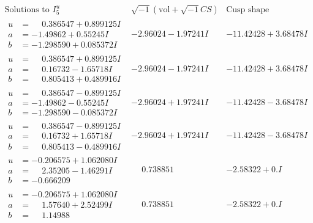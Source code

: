 \documentclass[1p]{elsarticle_modified}
\theoremstyle{definition}
\newcommand{\I}{\sqrt{-1}}
\begin{document}
$$\begin{array}{c|c|c}  
\text{Solutions to }I^u_{5}& \I (\text{vol} + \sqrt{-1}CS) & \text{Cusp shape}\\
 \hline 
\begin{aligned}
u &= \phantom{-}0.386547 + 0.899125 I \\
a &= -1.49862 + 0.55245 I \\
b &= -1.298590 + 0.085372 I\end{aligned}
 & -2.96024 - 1.97241 I & -11.42428 + 3.68478 I \\ \hline\begin{aligned}
u &= \phantom{-}0.386547 + 0.899125 I \\
a &= \phantom{-}0.16732 - 1.65718 I \\
b &= \phantom{-}0.805413 + 0.489916 I\end{aligned}
 & -2.96024 - 1.97241 I & -11.42428 + 3.68478 I \\ \hline\begin{aligned}
u &= \phantom{-}0.386547 - 0.899125 I \\
a &= -1.49862 - 0.55245 I \\
b &= -1.298590 - 0.085372 I\end{aligned}
 & -2.96024 + 1.97241 I & -11.42428 - 3.68478 I \\ \hline\begin{aligned}
u &= \phantom{-}0.386547 - 0.899125 I \\
a &= \phantom{-}0.16732 + 1.65718 I \\
b &= \phantom{-}0.805413 - 0.489916 I\end{aligned}
 & -2.96024 + 1.97241 I & -11.42428 - 3.68478 I \\ \hline\begin{aligned}
u &= -0.206575 + 1.062080 I \\
a &= \phantom{-}2.35205 - 1.46291 I \\
b &= -0.666209\phantom{ +0.000000I}\end{aligned}
 & \phantom{-}0.738851\phantom{ +0.000000I} & -2.58322 + 0. I\phantom{ +0.000000I} \\ \hline\begin{aligned}
u &= -0.206575 + 1.062080 I \\
a &= \phantom{-}1.57640 + 2.52499 I \\
b &= \phantom{-}1.14988\phantom{ +0.000000I}\end{aligned}
 & \phantom{-}0.738851\phantom{ +0.000000I} & -2.58322 + 0. I\phantom{ +0.000000I} \\ \hline\begin{aligned}

\end{aligned}
\end{array}$$
\end{document}
